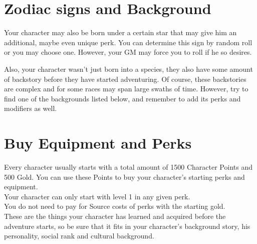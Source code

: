 \section{Zodiac signs and Background}\label{sec:charCreationBackgrounds}

Your character may also be born under a certain star that may give him an additional, maybe even unique perk.
You can determine this sign by random roll or you may choose one.
However, your GM may force you to roll if he so desires.

Also, your character wasn't just born into a species, they also have some amount of backstory before they have started adventuring.
Of course, these backstories are complex and for some races may span large swaths of time.
However, try to find one of the backgrounds listed below, and remember to add its perks and modifiers as well.


\section{Buy Equipment and Perks}\label{sec:charCreationPerkAndEquip}

Every character usually starts with a total amount of 1500 Character Points and 500 Gold.
You can use these Points to buy your character's starting perks and equipment.\\
Your character can only start with level 1 in any given perk.\\
You do not need to pay for Source costs of perks with the starting gold.\\
These are the things your character has learned and acquired before the adventure starts, so be sure that it fits in your character's background story, his personality, social rank and cultural background.\\